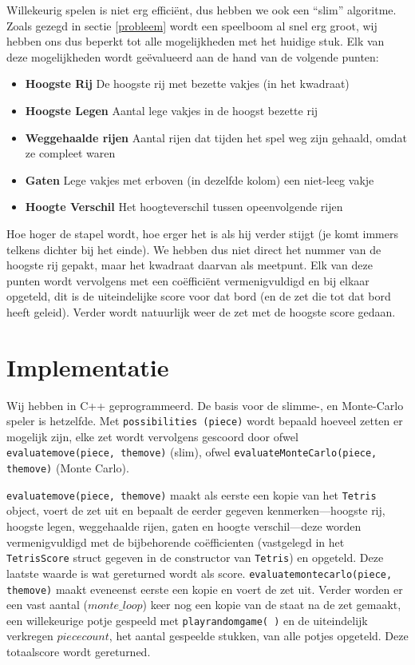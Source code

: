 \documentclass[10pt]{article}
\begin{document}
Willekeurig spelen is niet erg effici\"{e}nt, dus hebben we ook een ``slim'' algoritme. Zoals gezegd in sectie \ref{probleem} wordt een speelboom al snel erg groot, wij hebben ons dus beperkt tot alle mogelijkheden met het huidige stuk. Elk van deze mogelijkheden wordt ge\"{e}valueerd aan de hand van de volgende punten:
\begin{itemize}

\item \textbf{Hoogste Rij} De hoogste rij met bezette vakjes (in het kwadraat)

\item \textbf{Hoogste Legen} Aantal lege vakjes in de hoogst bezette rij

\item \textbf{Weggehaalde rijen} Aantal rijen dat tijden het spel weg zijn gehaald, omdat ze compleet waren

\item \textbf{Gaten} Lege vakjes met erboven (in dezelfde kolom) een niet-leeg vakje

\item \textbf{Hoogte Verschil} Het hoogteverschil tussen opeenvolgende rijen

\end{itemize}
Hoe hoger de stapel wordt, hoe erger het is als hij verder stijgt (je komt immers telkens dichter bij het einde). We hebben dus niet direct het nummer van de hoogste rij gepakt, maar het kwadraat daarvan als meetpunt. Elk van deze punten wordt vervolgens met een co\"effici\"ent vermenigvuldigd en bij elkaar opgeteld, dit is de uiteindelijke score voor dat bord (en de zet die tot dat bord heeft geleid). Verder wordt natuurlijk weer de zet met de hoogste score gedaan.

\section{Implementatie}

Wij hebben in C++ geprogrammeerd. De basis voor de slimme-, en Monte-Carlo speler is hetzelfde. Met \verb+possibilities (piece)+ wordt bepaald hoeveel zetten er mogelijk zijn, elke zet wordt vervolgens gescoord door ofwel \verb+evaluatemove(piece, themove)+ (slim), ofwel \verb+evaluateMonteCarlo(piece, themove)+ (Monte Carlo).

\verb+evaluatemove(piece, themove)+ maakt als eerste een kopie van het \verb+Tetris+ object, voert de zet uit en bepaalt de eerder gegeven kenmerken---hoogste rij, hoogste legen, weggehaalde rijen, gaten en hoogte verschil---deze worden vermenigvuldigd met de bijbehorende co\"{e}fficienten (vastgelegd in het \verb+TetrisScore+ struct gegeven in de constructor van \verb+Tetris+) en opgeteld. Deze laatste waarde is wat gereturned wordt als score.
\verb+evaluatemontecarlo(piece, themove)+ maakt eveneenst eerste een kopie en voert de zet uit. Verder worden er een vast aantal ($monte\_loop$) keer nog een kopie van de staat na de zet gemaakt, een willekeurige potje gespeeld met \verb+playrandomgame( )+ en de uiteindelijk verkregen $piececount$, het aantal gespeelde stukken, van alle potjes opgeteld. Deze totaalscore wordt gereturned.
\end{document}
